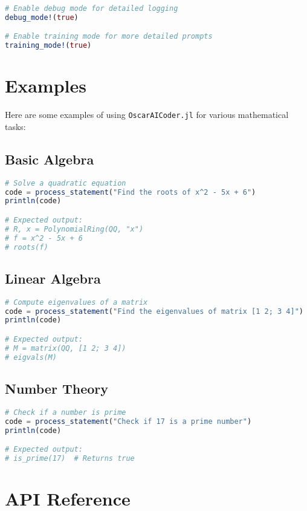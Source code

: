 \documentclass[11pt,a4paper]{article}
\newcommand{\modname}[1]{\texttt{#1}}
\begin{document}
\begin{lstlisting}[language=Julia]
# Enable debug mode for detailed logging
debug_mode!(true)

# Enable training mode for more detailed prompts
training_mode!(true)
\end{lstlisting}

\section{Examples}
\label{sec:examples}

Here are some examples of using \modname{OscarAICoder.jl} for various mathematical tasks:

\subsection{Basic Algebra}

\begin{lstlisting}[language=Julia]
# Solve a quadratic equation
code = process_statement("Find the roots of x^2 - 5x + 6")
println(code)

# Expected output:
# R, x = PolynomialRing(QQ, "x")
# f = x^2 - 5x + 6
# roots(f)
\end{lstlisting}

\subsection{Linear Algebra}

\begin{lstlisting}[language=Julia]
# Compute eigenvalues of a matrix
code = process_statement("Find the eigenvalues of matrix [1 2; 3 4]")
println(code)

# Expected output:
# M = matrix(QQ, [1 2; 3 4])
# eigvals(M)
\end{lstlisting}

\subsection{Number Theory}

\begin{lstlisting}[language=Julia]
# Check if a number is prime
code = process_statement("Check if 17 is a prime number")
println(code)

# Expected output:
# is_prime(17)  # Returns true
\end{lstlisting}

\section{API Reference}
\label{sec:api_reference}
\end{document}
